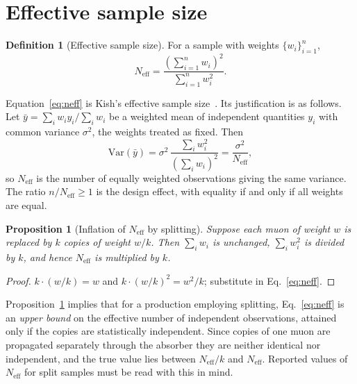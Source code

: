 \documentclass[11pt,a4paper]{article}
\theoremstyle{definition}
\newtheorem{definition}{Definition}[section]
\theoremstyle{plain}
\newtheorem{proposition}{Proposition}[section]
\theoremstyle{remark}
\newcommand{\Neff}{N_{\mathrm{eff}}}
\newcommand{\Var}{\mathrm{Var}}
\begin{document}
\section{Effective sample size}
\label{sec:neff}

\begin{definition}[Effective sample size]
For a sample with weights $\{w_i\}_{i=1}^n$,
\begin{equation}
  \Neff = \frac{\left(\sum_{i=1}^{n} w_i\right)^{2}}{\sum_{i=1}^{n} w_i^{2}} .
  \label{eq:neff}
\end{equation}
\end{definition}

Equation~\eqref{eq:neff} is Kish's effective sample size~\cite{Kish1965}. Its
justification is as follows. Let $\bar{y} = \sum_i w_i y_i / \sum_i w_i$ be a
weighted mean of independent quantities $y_i$ with common variance $\sigma^2$,
the weights treated as fixed. Then
\begin{equation}
  \Var(\bar{y})
  = \sigma^{2}\,\frac{\sum_i w_i^{2}}{\left(\sum_i w_i\right)^{2}}
  = \frac{\sigma^{2}}{\Neff},
\end{equation}
so $\Neff$ is the number of equally weighted observations giving the same
variance. The ratio $n/\Neff \ge 1$ is the design effect, with equality if and
only if all weights are equal.

\begin{proposition}[Inflation of $\Neff$ by splitting]
\label{prop:split}
Suppose each muon of weight $w$ is replaced by $k$ copies of weight $w/k$.
Then $\sum_i w_i$ is unchanged, $\sum_i w_i^{2}$ is divided by $k$, and hence
$\Neff$ is multiplied by $k$.
\end{proposition}

\begin{proof}
$k \cdot (w/k) = w$ and $k \cdot (w/k)^2 = w^2/k$; substitute in
Eq.~\eqref{eq:neff}.
\end{proof}

Proposition~\ref{prop:split} implies that for a production employing splitting,
Eq.~\eqref{eq:neff} is an \emph{upper bound} on the effective number of
independent observations, attained only if the copies are statistically
independent. Since copies of one muon are propagated separately through the
absorber they are neither identical nor independent, and the true value lies
between $\Neff/k$ and $\Neff$. Reported values of $\Neff$ for split samples must
be read with this in mind.
\end{document}
